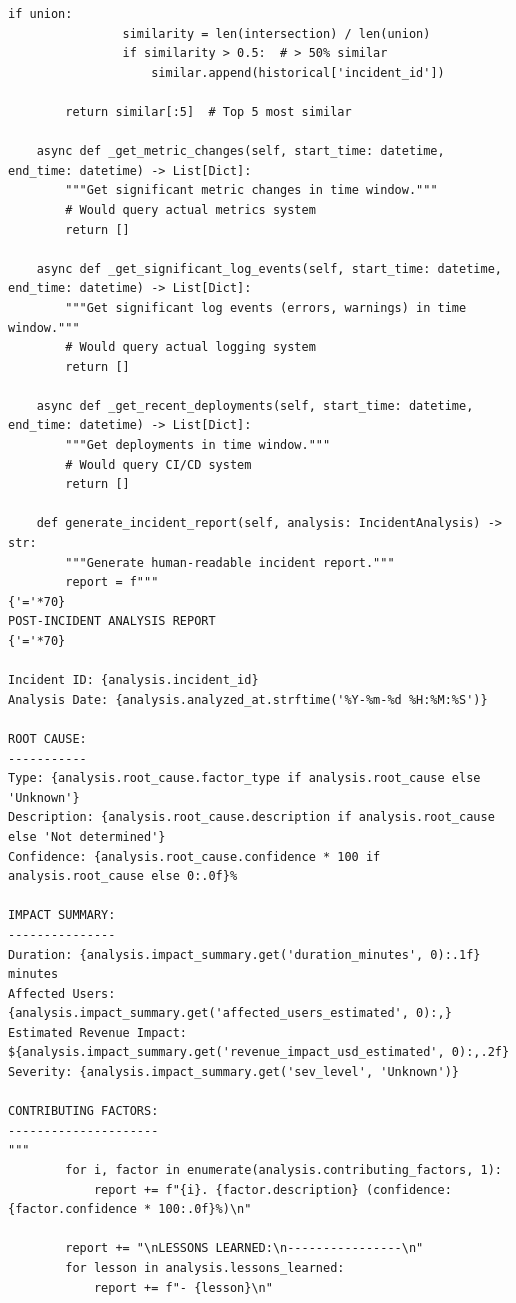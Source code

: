 \begin{lstlisting}[style=python, caption={Post-incident analysis with root cause identification}]
            if union:
                similarity = len(intersection) / len(union)
                if similarity > 0.5:  # > 50% similar
                    similar.append(historical['incident_id'])

        return similar[:5]  # Top 5 most similar

    async def _get_metric_changes(self, start_time: datetime, end_time: datetime) -> List[Dict]:
        """Get significant metric changes in time window."""
        # Would query actual metrics system
        return []

    async def _get_significant_log_events(self, start_time: datetime, end_time: datetime) -> List[Dict]:
        """Get significant log events (errors, warnings) in time window."""
        # Would query actual logging system
        return []

    async def _get_recent_deployments(self, start_time: datetime, end_time: datetime) -> List[Dict]:
        """Get deployments in time window."""
        # Would query CI/CD system
        return []

    def generate_incident_report(self, analysis: IncidentAnalysis) -> str:
        """Generate human-readable incident report."""
        report = f"""
{'='*70}
POST-INCIDENT ANALYSIS REPORT
{'='*70}

Incident ID: {analysis.incident_id}
Analysis Date: {analysis.analyzed_at.strftime('%Y-%m-%d %H:%M:%S')}

ROOT CAUSE:
-----------
Type: {analysis.root_cause.factor_type if analysis.root_cause else 'Unknown'}
Description: {analysis.root_cause.description if analysis.root_cause else 'Not determined'}
Confidence: {analysis.root_cause.confidence * 100 if analysis.root_cause else 0:.0f}%

IMPACT SUMMARY:
---------------
Duration: {analysis.impact_summary.get('duration_minutes', 0):.1f} minutes
Affected Users: {analysis.impact_summary.get('affected_users_estimated', 0):,}
Estimated Revenue Impact: ${analysis.impact_summary.get('revenue_impact_usd_estimated', 0):,.2f}
Severity: {analysis.impact_summary.get('sev_level', 'Unknown')}

CONTRIBUTING FACTORS:
---------------------
"""
        for i, factor in enumerate(analysis.contributing_factors, 1):
            report += f"{i}. {factor.description} (confidence: {factor.confidence * 100:.0f}%)\n"

        report += "\nLESSONS LEARNED:\n----------------\n"
        for lesson in analysis.lessons_learned:
            report += f"- {lesson}\n"


\end{lstlisting}
